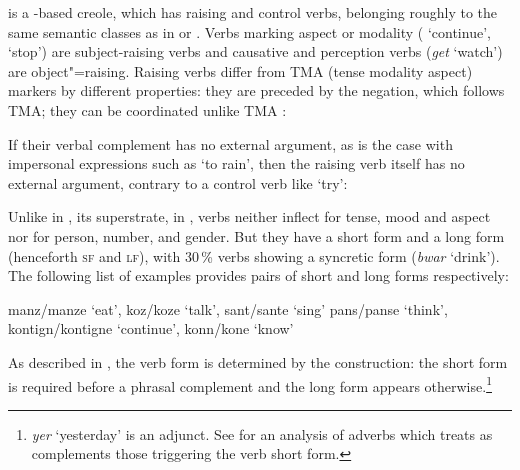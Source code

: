 \documentclass[output=paper
	        ,collection
	        ,collectionchapter
 	        ,biblatex
                ,babelshorthands
                ,newtxmath
                ,draftmode
                ,colorlinks, citecolor=brown
]{langscibook}
\begin{document}
 is a -based creole, which has raising and control verbs, belonging
roughly to the same semantic classes as in  or . Verbs marking aspect or
modality ( `continue',  `stop') are subject-raising verbs and causative and
perception verbs (\emph{get} `watch') are object"=raising. Raising verbs differ from TMA (tense
modality aspect) markers by different properties: they are preceded by the negation, which follows
TMA; they can be coordinated unlike TMA \citep[]{HenriandLaurens2011}:

\eal
{}
\zl
 
If their verbal complement has no external argument, as is the case with impersonal expressions such as  `to rain', then the raising verb itself has no external argument, contrary to a control verb like  `try':

\eal
{}
\zl

Unlike in , its superstrate, in ,  verbs neither inflect for tense, mood and aspect nor for person, number, and
gender. But they have a short form and a long form (henceforth \textsc{sf} and \textsc{lf}), with
30\,\% verbs showing a syncretic form (\emph{bwar} `drink'). The following list of examples provides pairs of short and
long forms respectively:

\eal
\ex manz/manze `eat', koz/koze `talk', sant/sante `sing'
\ex pans/panse `think', kontign/kontigne `continue', konn/kone `know'
\zl

As described in \citet{Henri2010}, the verb form is determined by the construction: the short form is required before a phrasal complement and the long form appears otherwise.\footnote{\textit{yer} `yesterday' is an adjunct. See  for an analysis of  adverbs which treats as complements those triggering the verb short form.}
\end{document}
